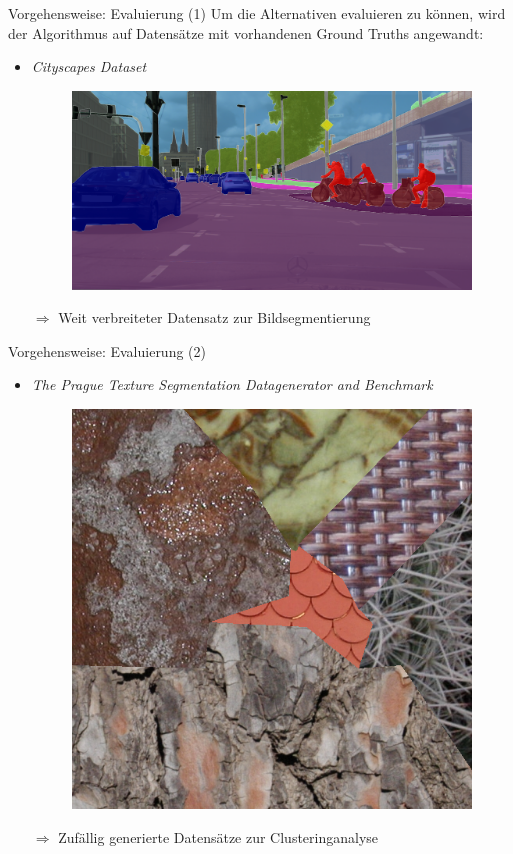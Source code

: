 \documentclass[9pt]{beamer}
\begin{document}
\begin{frame}{Vorgehensweise: Evaluierung (1)}
Um die Alternativen evaluieren zu können, wird der Algorithmus auf Datensätze mit vorhandenen Ground Truths angewandt:
\medskip
\begin{itemize}
	\item \textit{Cityscapes Dataset}\footnotemark[1]
	\begin{figure}[H]
		\includegraphics[width=.7\textwidth,keepaspectratio]{koeln00.png}
	\end{figure}
	\item[$\Rightarrow$] Weit verbreiteter Datensatz zur Bildsegmentierung
\end{itemize}
\end{frame}
\begin{frame}{Vorgehensweise: Evaluierung (2)}
\begin{itemize}
	\item \textit{The Prague Texture Segmentation Datagenerator and Benchmark}\footnotemark[1]
	\begin{figure}[H]
		\includegraphics[width=.4\textwidth,keepaspectratio]{prague.png}
	\end{figure}
	\item[$\Rightarrow$] Zufällig generierte Datensätze zur Clusteringanalyse
\end{itemize}
\end{frame}
\end{document}
